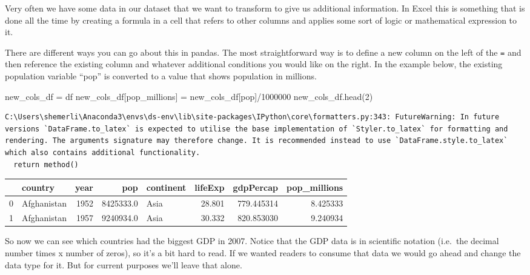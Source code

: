 \documentclass[
  letterpaper,
  DIV=11,
  numbers=noendperiod]{scrreprt}
\newenvironment{Shaded}{\begin{snugshade}}{\end{snugshade}}
\newcommand{\DecValTok}[1]{\textcolor[rgb]{0.68,0.00,0.00}{#1}}
\newcommand{\NormalTok}[1]{\textcolor[rgb]{0.00,0.23,0.31}{#1}}
\newcommand{\OperatorTok}[1]{\textcolor[rgb]{0.37,0.37,0.37}{#1}}
\newcommand{\StringTok}[1]{\textcolor[rgb]{0.13,0.47,0.30}{#1}}
\begin{document}
Very often we have some data in our dataset that we want to transform to
give us additional information. In Excel this is something that is done
all the time by creating a formula in a cell that refers to other
columns and applies some sort of logic or mathematical expression to it.

There are different ways you can go about this in pandas. The most
straightforward way is to define a new column on the left of the
\texttt{=} and then reference the existing column and whatever
additional conditions you would like on the right. In the example below,
the existing population variable ``pop'' is converted to a value that
shows population in millions.

\begin{Shaded}
\begin{Highlighting}[]
\NormalTok{new\_cols\_df }\OperatorTok{=}\NormalTok{ df}
\NormalTok{new\_cols\_df[}\StringTok{\textquotesingle{}pop\_millions\textquotesingle{}}\NormalTok{] }\OperatorTok{=}\NormalTok{ new\_cols\_df[}\StringTok{\textquotesingle{}pop\textquotesingle{}}\NormalTok{]}\OperatorTok{/}\DecValTok{1000000}
\NormalTok{new\_cols\_df.head(}\DecValTok{2}\NormalTok{)}
\end{Highlighting}
\end{Shaded}

\begin{verbatim}
C:\Users\shemerli\Anaconda3\envs\ds-env\lib\site-packages\IPython\core\formatters.py:343: FutureWarning: In future versions `DataFrame.to_latex` is expected to utilise the base implementation of `Styler.to_latex` for formatting and rendering. The arguments signature may therefore change. It is recommended instead to use `DataFrame.style.to_latex` which also contains additional functionality.
  return method()
\end{verbatim}

\begin{tabular}{llrrlrrr}
\toprule
{} &      country &  year &        pop & continent &  lifeExp &   gdpPercap &  pop\_millions \\
\midrule
0 &  Afghanistan &  1952 &  8425333.0 &      Asia &   28.801 &  779.445314 &      8.425333 \\
1 &  Afghanistan &  1957 &  9240934.0 &      Asia &   30.332 &  820.853030 &      9.240934 \\
\bottomrule
\end{tabular}

So now we can see which countries had the biggest GDP in 2007. Notice
that the GDP data is in scientific notation (i.e.~the decimal number
times x number of zeros), so it's a bit hard to read. If we wanted
readers to consume that data we would go ahead and change the data type
for it. But for current purposes we'll leave that alone.
\end{document}
